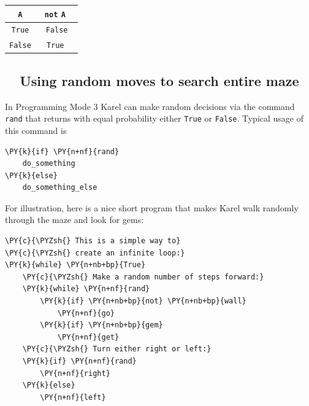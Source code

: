 \begin{center}
\begin{tabular}{|c||c|}
\hline
{\tt A} & \ {\tt not} {\tt A} \ \\
\hline
\hline
{\tt True} & {\tt False} \\
\hline
{\tt False} & \ {\tt True} \ \\
\hline
\end{tabular}
\end{center}
\vspace{4mm}
\noindent

\subsection{\ \ Using random moves to search entire maze}

In Programming Mode 3 Karel can make random decisions via the command {\tt rand}
that returns with equal probability either {\tt True} or {\tt False}. 
Typical usage of this command is \\

\begin{bbox}
\begin{Verbatim}[commandchars=\\\{\}]
\PY{k}{if} \PY{n+nf}{rand}
    do_something
\PY{k}{else}
    do_something_else
\end{Verbatim}
\end{bbox}
\vspace{6mm}

\noindent
For illustration, here is a nice short program that makes Karel walk randomly 
through the maze and look for gems:\\

\begin{bbox}
\begin{Verbatim}[commandchars=\\\{\}]
\PY{c}{\PYZsh{} This is a simple way to}
\PY{c}{\PYZsh{} create an infinite loop:}
\PY{k}{while} \PY{n+nb+bp}{True}
    \PY{c}{\PYZsh{} Make a random number of steps forward:}
    \PY{k}{while} \PY{n+nf}{rand}
        \PY{k}{if} \PY{n+nb+bp}{not} \PY{n+nb+bp}{wall} 
            \PY{n+nf}{go}
        \PY{k}{if} \PY{n+nb+bp}{gem} 
            \PY{n+nf}{get}
    \PY{c}{\PYZsh{} Turn either right or left:}
    \PY{k}{if} \PY{n+nf}{rand}
        \PY{n+nf}{right}
    \PY{k}{else}
        \PY{n+nf}{left}
\end{Verbatim}
\end{bbox}
\vspace{6mm}

